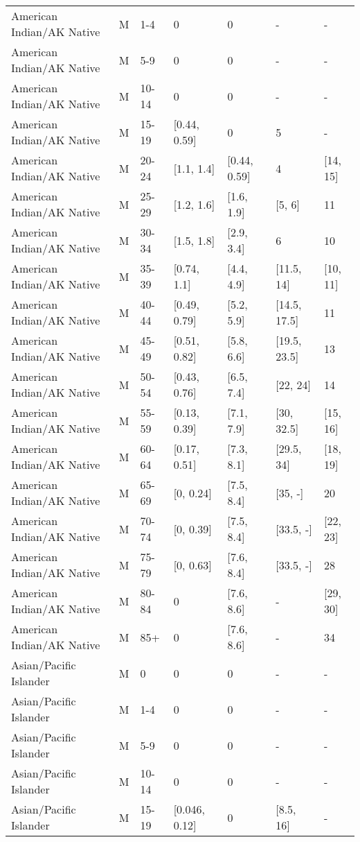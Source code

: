 \begin{table}[ht]
\begin{tabular}{lllllll}
  American Indian/AK Native & M & 1-4 & 0 & 0 & - & - \\ 
  American Indian/AK Native & M & 5-9 & 0 & 0 & - & - \\ 
  American Indian/AK Native & M & 10-14 & 0 & 0 & - & - \\ 
  American Indian/AK Native & M & 15-19 & [0.44, 0.59] & 0 & 5 & - \\ 
  American Indian/AK Native & M & 20-24 & [1.1, 1.4] & [0.44, 0.59] & 4 & [14, 15] \\ 
  American Indian/AK Native & M & 25-29 & [1.2, 1.6] & [1.6, 1.9] & [5, 6] & 11 \\ 
  American Indian/AK Native & M & 30-34 & [1.5, 1.8] & [2.9, 3.4] & 6 & 10 \\ 
  American Indian/AK Native & M & 35-39 & [0.74, 1.1] & [4.4, 4.9] & [11.5, 14] & [10, 11] \\ 
  American Indian/AK Native & M & 40-44 & [0.49, 0.79] & [5.2, 5.9] & [14.5, 17.5] & 11 \\ 
  American Indian/AK Native & M & 45-49 & [0.51, 0.82] & [5.8, 6.6] & [19.5, 23.5] & 13 \\ 
  American Indian/AK Native & M & 50-54 & [0.43, 0.76] & [6.5, 7.4] & [22, 24] & 14 \\ 
  American Indian/AK Native & M & 55-59 & [0.13, 0.39] & [7.1, 7.9] & [30, 32.5] & [15, 16] \\ 
  American Indian/AK Native & M & 60-64 & [0.17, 0.51] & [7.3, 8.1] & [29.5, 34] & [18, 19] \\ 
  American Indian/AK Native & M & 65-69 & [0, 0.24] & [7.5, 8.4] & [35, -] & 20 \\ 
  American Indian/AK Native & M & 70-74 & [0, 0.39] & [7.5, 8.4] & [33.5, -] & [22, 23] \\ 
  American Indian/AK Native & M & 75-79 & [0, 0.63] & [7.6, 8.4] & [33.5, -] & 28 \\ 
  American Indian/AK Native & M & 80-84 & 0 & [7.6, 8.6] & - & [29, 30] \\ 
  American Indian/AK Native & M & 85+ & 0 & [7.6, 8.6] & - & 34 \\ 
  Asian/Pacific Islander & M & 0 & 0 & 0 & - & - \\ 
  Asian/Pacific Islander & M & 1-4 & 0 & 0 & - & - \\ 
  Asian/Pacific Islander & M & 5-9 & 0 & 0 & - & - \\ 
  Asian/Pacific Islander & M & 10-14 & 0 & 0 & - & - \\ 
  Asian/Pacific Islander & M & 15-19 & [0.046, 0.12] & 0 & [8.5, 16] & - \\ 

\end{tabular}
\end{table}

